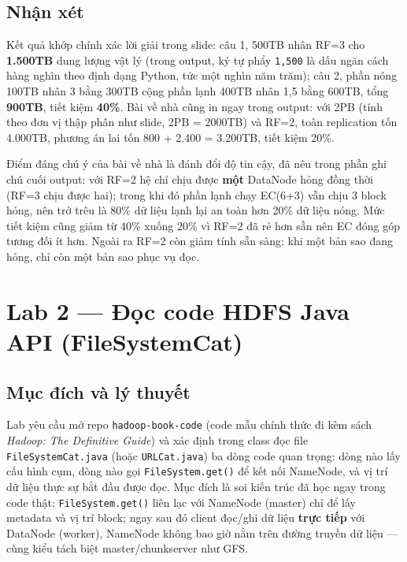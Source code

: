 \documentclass[12pt,a4paper,oneside]{article}
\begin{document}


\subsection{Nhận xét}

Kết quả khớp chính xác lời giải trong slide: câu 1, 500TB nhân RF=3 cho \textbf{1.500TB} dung lượng vật lý (trong output, ký tự phẩy \texttt{1,500} là dấu ngăn cách hàng nghìn theo định dạng Python, tức một nghìn năm trăm); câu 2, phần nóng 100TB nhân 3 bằng 300TB cộng phần lạnh 400TB nhân 1,5 bằng 600TB, tổng \textbf{900TB}, tiết kiệm \textbf{40\%}. Bài về nhà cũng in ngay trong output: với 2PB (tính theo đơn vị thập phân như slide, 2PB = 2000TB) và RF=2, toàn replication tốn 4.000TB, phương án lai tốn 800 + 2.400 = 3.200TB, tiết kiệm 20\%.

Điểm đáng chú ý của bài về nhà là đánh đổi độ tin cậy, đã nêu trong phần ghi chú cuối output: với RF=2 hệ chỉ chịu được \textbf{một} DataNode hỏng đồng thời (RF=3 chịu được hai); trong khi đó phần lạnh chạy EC(6+3) vẫn chịu 3 block hỏng, nên trớ trêu là 80\% dữ liệu lạnh lại an toàn hơn 20\% dữ liệu nóng. Mức tiết kiệm cũng giảm từ 40\% xuống 20\% vì RF=2 đã rẻ hơn sẵn nên EC đóng góp tương đối ít hơn. Ngoài ra RF=2 còn giảm tính sẵn sàng: khi một bản sao đang hỏng, chỉ còn một bản sao phục vụ đọc.

\section{Lab 2 --- Đọc code HDFS Java API (FileSystemCat)}
\label{sec:lab2}

\subsection{Mục đích và lý thuyết}

Lab yêu cầu mở repo \texttt{hadoop-book-code} (code mẫu chính thức đi kèm sách \emph{Hadoop: The Definitive Guide}) và xác định trong class đọc file \texttt{FileSystemCat.java} (hoặc \texttt{URLCat.java}) ba dòng code quan trọng: dòng nào lấy cấu hình cụm, dòng nào gọi \texttt{FileSystem.get()} để kết nối NameNode, và vị trí dữ liệu thực sự bắt đầu được đọc. Mục đích là soi kiến trúc đã học ngay trong code thật: \texttt{FileSystem.get()} liên lạc với NameNode (master) chỉ để lấy metadata và vị trí block; ngay sau đó client đọc/ghi dữ liệu \textbf{trực tiếp} với DataNode (worker), NameNode không bao giờ nằm trên đường truyền dữ liệu --- cùng kiểu tách biệt master/chunkserver như GFS.
\end{document}
